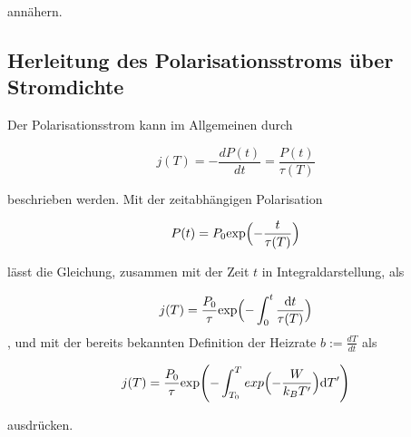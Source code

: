 annähern.

\subsection{Herleitung des Polarisationsstroms über Stromdichte}
\label{sec:int}

Der Polarisationsstrom kann im Allgemeinen durch 

\begin{equation}
    j(T) = -\frac{dP(t)}{dt} = \frac{P(t)}{\tau(T)}
\end{equation}

beschrieben werden. Mit der zeitabhängigen Polarisation 

\begin{equation}
    P(t) = P_0 \text{exp} \Bigl( - \frac{t}{\tau(T)} \Bigr)
\end{equation}

lässt die Gleichung, zusammen mit der Zeit $t$ in Integraldarstellung, als 

\begin{equation}
    j(T) = \frac{P_0}{\tau} \text{exp} \Bigl( - \int_0^t \frac{\text{d}t}{\tau(T)} \Bigr)    
\end{equation}, und mit der bereits bekannten Definition der Heizrate $b := \frac{dT}{dt}$ als 

\begin{equation}
    j(T) = \frac{P_0}{\tau} \text{exp} \Biggl( - \int_{T_0}^T exp \Bigl( -\frac{W}{k_B T'} \Bigr) \text{d}T' \Biggr)
\end{equation}

ausdrücken.